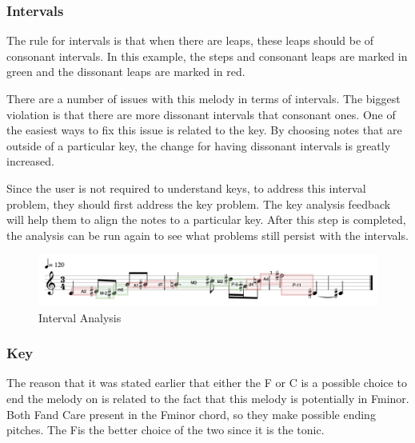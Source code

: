 \subsubsection{Intervals}
\label{subsubsec:intervals}

The rule for intervals is that when there are leaps, these leaps should be of consonant intervals.  In this example, the steps and consonant leaps are marked in green and the dissonant leaps are marked in red.

\vspace{\baselineskip}

There are a number of issues with this melody in terms of intervals.  The biggest violation is that there are more dissonant intervals that consonant ones.  One of the easiest ways to fix this issue is related to the key.  By choosing notes that are outside of a particular key, the change for having dissonant intervals is greatly increased.

\vspace{\baselineskip}

Since the user is not required to understand keys, to address this interval problem, they should first address the key problem.  The key analysis feedback will help them to align the notes to a particular key.  After this step is completed, the analysis can be run again to see what problems still persist with the intervals.

\begin{figure}[!htbp]
	\centering
	\caption{Interval Analysis}
	\includegraphics[scale=0.4]{images/intervals.png}
\end{figure}

\subsubsection{Key}
\label{subsubsec:key}

The reason that it was stated earlier that either the F or C is a possible choice to end the melody on is related to the fact that this melody is potentially in F\sh minor.  Both F\sh and C\sh are present in the F\sh minor chord, so they make possible ending pitches.  The F\sh is the better choice of the two since it is the tonic.

\vspace{\baselineskip}

